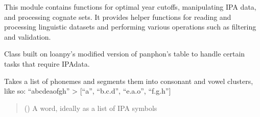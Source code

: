 \documentclass[letterpaper,10pt,english]{sphinxmanual}
\begin{document}
\sphinxAtStartPar
This module contains functions for
optimal year cutoffs, manipulating IPA data, and
processing cognate sets. It provides helper functions for reading and
processing linguistic datasets and performing various operations such as
filtering and validation.

\begin{fulllineitems}
\label{\detokenize{documentation:loanpy.utils.IPA}}
\pysigstartsignatures
{}
\pysigstopsignatures
\sphinxAtStartPar
Class built on loanpy’s modified version of panphon’s 
table to handle certain tasks that require IPA\sphinxhyphen{}data.

\sphinxAtStartPar
{}

\begin{sphinxVerbatim}[commandchars=\\\{\}]
   
  
\PYG{p}{[}\PYG{p}{]}
\end{sphinxVerbatim}

\begin{fulllineitems}
\label{\detokenize{documentation:loanpy.utils.IPA.get_clusters}}
\pysigstartsignatures
{}
\pysigstopsignatures
\sphinxAtStartPar
Takes a list of phonemes and segments them into consonant and vowel
clusters, like so: “abcdeaofgh” \sphinxhyphen{}\textgreater{} {[}“a”, “b.c.d”, “e.a.o”, “f.g.h”{]}
\begin{quote}\begin{description}
\sphinxAtStartPar
{} () \textendash{} A word, ideally as a list of IPA symbols


\end{description}
\end{quote}
\end{fulllineitems}
\end{fulllineitems}
\end{document}
